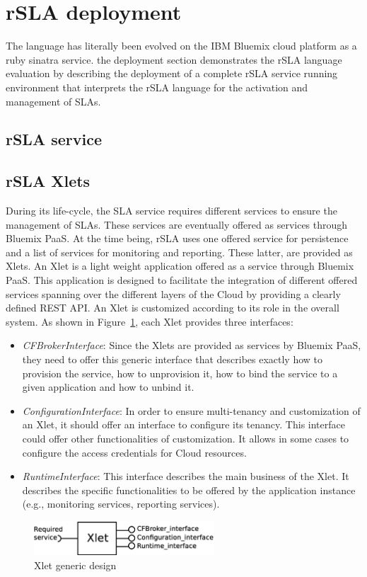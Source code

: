 \section{rSLA deployment }
The language has literally been evolved on the IBM Bluemix cloud platform as a ruby sinatra service.
the deployment section demonstrates the rSLA language evaluation by describing the deployment of a complete rSLA service running environment that interprets the rSLA language for the activation and management of SLAs.

\subsection{rSLA service}

\subsection{rSLA Xlets}
During its life-cycle, the SLA service requires different services to ensure the management of 
SLAs. These services are eventually offered as services through Bluemix PaaS. At the time being, 
rSLA uses one offered service for persistence and a list of services for monitoring and reporting. 
These latter, are provided as Xlets. An Xlet is a light weight application offered as a service 
through Bluemix PaaS. This application is designed to facilitate the integration of different 
offered services spanning over the different layers of the Cloud by providing a clearly defined REST 
API. An Xlet is customized according to its role in the overall system. As shown in 
Figure~\ref{fig:xlet}, each Xlet provides three interfaces:
\begin{itemize}
 \item \emph{CFBrokerInterface}: Since the Xlets are provided as services by Bluemix PaaS, they need 
to offer this generic interface that describes exactly how to provision the service, how to 
unprovision it, how to bind the service to a given application and how to unbind it.
 \item  \emph{ConfigurationInterface}: In order to ensure multi-tenancy and customization of an 
Xlet, it should offer an interface to configure its tenancy. This interface could offer other 
functionalities of customization. It allows in some cases to configure the access credentials for 
Cloud resources.
 \item  \emph{RuntimeInterface}: This interface describes the main business of the Xlet. It 
describes the specific functionalities to be offered by the application instance (e.g., monitoring 
services, reporting services). 
\end{itemize}
\begin{figure}[H]
\centering
\includegraphics[width=0.6\textwidth]{pics/Xlet}
\caption{\label{fig:xlet} Xlet generic design}
\end{figure}

